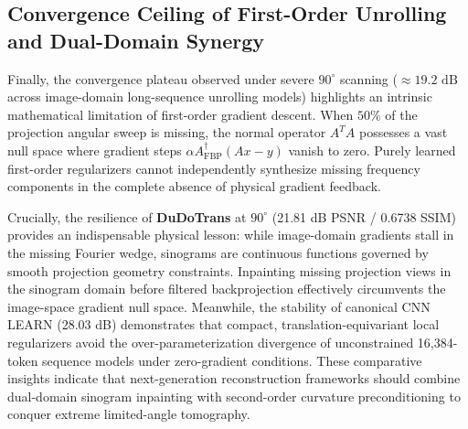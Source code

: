 \documentclass[runningheads]{llncs}
\begin{document}
\subsection{Convergence Ceiling of First-Order Unrolling and Dual-Domain Synergy}
Finally, the convergence plateau observed under severe $90^\circ$ scanning ($\approx 19.2\text{ dB}$ across image-domain long-sequence unrolling models) highlights an intrinsic mathematical limitation of first-order gradient descent. When $50\%$ of the projection angular sweep is missing, the normal operator $A^TA$ possesses a vast null space where gradient steps $\alpha A^\dagger_{\text{FBP}}(Ax - y)$ vanish to zero. Purely learned first-order regularizers cannot independently synthesize missing frequency components in the complete absence of physical gradient feedback. 

Crucially, the resilience of \textbf{DuDoTrans} at $90^\circ$ (21.81 dB PSNR / 0.6738 SSIM) provides an indispensable physical lesson: while image-domain gradients stall in the missing Fourier wedge, sinograms are continuous functions governed by smooth projection geometry constraints. Inpainting missing projection views in the sinogram domain before filtered backprojection effectively circumvents the image-space gradient null space. Meanwhile, the stability of canonical CNN LEARN (28.03 dB) demonstrates that compact, translation-equivariant local regularizers avoid the over-parameterization divergence of unconstrained 16,384-token sequence models under zero-gradient conditions. These comparative insights indicate that next-generation reconstruction frameworks should combine dual-domain sinogram inpainting with second-order curvature preconditioning to conquer extreme limited-angle tomography.
\end{document}
